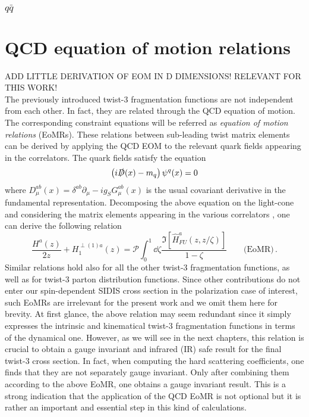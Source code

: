\subsubsection*{$q \bar q$}
\section{QCD equation of motion relations}
\noindent ADD LITTLE DERIVATION OF EOM IN D DIMENSIONS! RELEVANT FOR THIS WORK!\\

The previously introduced twist-3 fragmentation functions are not independent from each other. In fact, they are related through the QCD equation of motion. The corresponding constraint equations will be referred as \textit{equation of motion relations} (EoMRs). These relations between sub-leading twist matrix elements can be derived by applying the QCD EOM to the relevant quark fields appearing in the correlators. The quark fields satisfy the equation
\begin{equation}
    \left(i \slashed{D}(x) -m_q \right)\psi^q(x)=0
\end{equation}
where $D_\mu^{ab}(x)=\delta^{ab}\partial_\mu -ig_S G_\mu^{ab}(x)$ is the usual covariant derivative in the fundamental representation. Decomposing the above equation on the light-cone and considering the matrix elements appearing in the various correlators \cite{bacchetta_semi-inclusive_2007}, one can derive the following relation \cite{kanazawa_operator_2016}
\begin{equation}\label{eq:eomr H}
    \frac{H^a(z)}{2 z}+H_1^{\perp(1)a}(z)= \mathcal{P}\int_0^1\dd \zeta\frac{\Im[\hat H^a_{FU}(z,z/\zeta)]}{1-\zeta}\qquad \text{(EoMR)}\,.
\end{equation}
Similar relations hold also for all the other twist-3 fragmentation functions, as well as for twist-3 parton distribution functions. Since other contributions do not enter our spin-dependent SIDIS cross section in the polarization case of interest, such EoMRs are irrelevant for the present work and we omit them here for brevity. At first glance, the above relation may seem redundant since it simply expresses the intrinsic and kinematical twist-3 fragmentation functions in terms of the dynamical one. However, as we will see in the next chapters, this relation is crucial to obtain a gauge invariant and infrared (IR) safe result for the final twist-3 cross section. In fact, when computing the hard scattering coefficients, one finds that they are not separately gauge invariant. Only after combining them according to the above EoMR, one obtains a gauge invariant result. This is a strong indication that the application of the QCD EoMR is not optional but it is rather an important and essential step in this kind of calculations.

